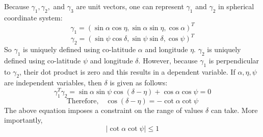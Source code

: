 \documentclass[a4paper,10pt]{report}
\numberwithin{equation}{chapter}
\begin{document}
%

\noindent Because $\gamma_1,\gamma_2,$ and $\gamma_3$ are unit vectors,
one can represent $\gamma_1$ and $\gamma_2$ in spherical coordinate system:
\[\gamma_1 = (\sin\alpha \cos\eta,\sin\alpha \sin\eta,\cos\alpha)^T\]
\[\gamma_2 = (\sin\psi \cos\delta,\sin\psi \sin\delta,\cos\psi)^T\]
So $\gamma_1$ is uniquely defined using co-latitude $\alpha$ and longitude $\eta$.
$\gamma_2$ is uniquely defined using co-latitude $\psi$ and longitude $\delta$.
However, because $\gamma_1$ is perpendicular to $\gamma_2$, their dot product is zero
and this results in a dependent variable. If $\alpha, \eta, \psi$ are independent
variables, then $\delta$ is given as follows:
\[\gamma_1^T \gamma_2 = \sin\alpha \sin\psi \cos(\delta-\eta) + \cos\alpha \cos\psi = 0 \]
\[\text{Therefore,}\quad \cos(\delta-\eta) = -\cot\alpha \cot\psi \]
The above equation imposes a constraint on the range of values $\delta$ can take.
More importantly, 
\begin{equation}
|\cot\alpha \cot\psi| \le 1 \label{eqn:constraint}
\end{equation}
\end{document}
